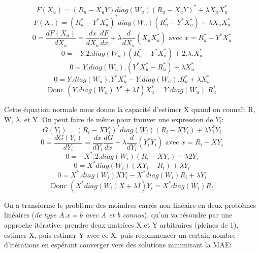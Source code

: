 \documentclass[12pt,a4paper]{article}
\begin{document}
$$F(X_u) = (R_u -X_uY) diag(W_u) (R_u -X_uY)^* + \lambda X_u X_u^*$$
$$F(X_u) = (R_u^* -Y^*X_u^*)^* diag(W_u) (R_u^* -Y^*X_u^*) + \lambda X_u X_u^*$$
$$0=\frac{dF(X_u)}{dX_u}=\frac{dx}{dX_u}\frac{dF}{dx}+\lambda \frac{d}{dX_u}(X_uX_u^*) \text{ avec } x=R_u^* -Y^*X_u^*$$
$$0=-Y.2.diag(W_u)(R_u^*-Y^*X_u^*)+2.\lambda.X_u^*$$
$$0=Y.diag(W_u).(Y^*X_u^*-R_u^*)+\lambda X_u^*$$
$$0=Y.diag(W_u).Y^*X_u^*-Y.diag(W_u).R_u^*+\lambda X_u^*$$
$$\text{Donc }(Y.diag(W_u).Y^*+\lambda I)X_u^* = Y.diag(W_u).R_u^*$$
\begin{center}
\end{center}
Cette équation normale nous donne la capacité d'estimer X quand on connaît R, W, $\lambda$, et Y. On peut faire de même pour trouver une expression de $Y_i$:
$$G(Y_i) = (R_i -XY_i)^* diag(W_i) (R_i -XY_i) + \lambda Y_i^*Y_i$$
$$0=\frac{dG(Y_i)}{dY_i}=\frac{dx}{dY_i}\frac{dG}{dx}+\lambda \frac{d}{dY_i}(Y_i^*Y_i)\text{ avec }x=R_i-XY_i$$
$$0=-X^*.2.diag(W_i)(R_i -XY_i) + \lambda 2 Y_i$$
$$0=X^*diag(W_i)(XY_i-R_i)+\lambda Y_i$$
$$0=X^*.diag(W_i)XY_i-X^*diag(W_i)R_i+\lambda Y_i$$
$$\text{Donc }(X^*diag(W_i)X+\lambda I)Y_i=X^*diag(W_i)R_i$$
\begin{center}
\end{center}
On a transformé le problème des moindres carrés non linéaire en deux problèmes linéaires (\textit{de type $A.x=b$ avec A et b connus}), qu'on va résoudre par une approche itérative: prendre deux matrices X et Y arbitraires (pleines de 1), estimer X, puis estimer Y avec ce X, puis recommencer un certain nombre d'itérations en espérant converger vers des solutions minimisant la MAE:
\newpage
\end{document}
